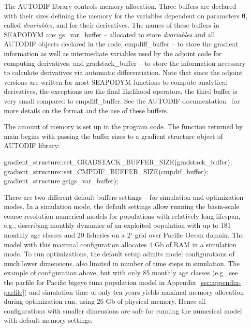 The AUTODIF library controls memory allocation. Three buffers are declared with their sizes defining the memory for the variables dependent on parameters $\boldsymbol\theta$, called \textit{dvariables}, and for their derivatives. The names of these buffers in SEAPODYM are: {\ttfamily gs\_var\_buffer} -- allocated to store \textit{dvariables} and all AUTODIF objects declared in the code, {\ttfamily cmpdiff\_buffer} -- to store the gradient information as well as intermediate variables used by the adjoint code for computing derivatives, and {\ttfamily gradstack\_buffer} -- to store the information necessary to calculate derivatives via automatic differentiation. Note that since the adjoint versions are written for most SEAPODYM functions to compute analytical derivatives, the exceptions are the final likelihood operators, the third buffer is very small compared to {\ttfamily cmpdiff\_buffer}. See the AUTODIF documentation~\citep{Autodif} for more details on the format and the use of these buffers. 

The amount of memory is set up in the program code. The function returned by {\ttfamily main} begins with passing the buffer sizes to a gradient structure object of AUTODIF library:

\vspace{0.35cm}
{\ttfamily
\indent	gradient\_structure::set\_GRADSTACK\_BUFFER\_SIZE(gradstack\_buffer);\\
\indent	gradient\_structure::set\_CMPDIF\_BUFFER\_SIZE(cmpdif\_buffer);\\
\indent	gradient\_structure gs(gs\_var\_buffer);\\
}

\noindent There are two different default buffers settings -- for simulation and optimization modes. In a simulation mode, the default settings allow running the basin-scale coarse resolution numerical models for populations with relatively long lifespan, e.g., describing monthly dynamics of an exploited population with up to 181 monthly age classes and 20 fisheries on a 2$^\circ$ grid over Pacific Ocean domain. The model with this maximal configuration allocates 4 Gb of RAM in a simulation mode. To run optimizations, the default setup admits model configurations of much lower dimensions, also limited in number of time steps in simulation. The example of configuration above, but with only 85 monthly age classes (e.g., see the parfile for Pacific bigeye tuna population model in Appendix~\ref{sec:appendix-parfile}) and simulation time of only ten years yields maximal memory allocation during optimization run,  using 26 Gb of physical memory. Hence all configurations with smaller dimensions are safe for running the numerical model with default memory settings. 


